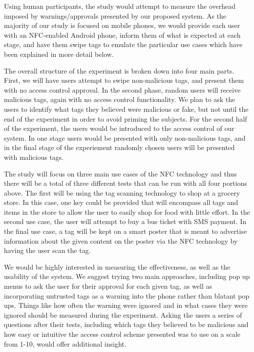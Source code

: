 \documentclass[12pt]{article}
\begin{document}
Using human participants, the study would attempt to measure the overhead imposed by warnings/approvals presented by our proposed system. As the majority of our study is focused on mobile phones, we would provide each user with an NFC-enabled Android phone, inform them of what is expected at each stage, and have them swipe tags to emulate the particular use cases which have been explained in more detail below.

The overall structure of the experiment is broken down into four main parts. First, we will have users attempt to swipe non-malicious tags, and present them with no access control approval. In the second phase, random users will receive malicious tags, again with no access control functionality. We plan to ask the users to identify what tags they believed were malicious or fake, but not until the end of the experiment in order to avoid priming the subjects. For the second half of the experiment, the users would be introduced to the access control of our system. In one stage users would be presented with only non-malicious tags, and in the final stage of the experiement randomly chosen users will be presented with malicious tags. 

The study will focus on three main use cases of the NFC technology and thus there will be a total of three different tests that can be run with all four portions above. The first will be using the tag scanning technology to shop at a grocery store. In this case, one key could be provided that will encompass all tags and items in the store to allow the user to easily shop for food with little effort. In the second use case, the user will attempt to buy a bus ticket with SMS payment. In the final use case, a tag will be kept on a smart poster that is meant to advertise information about the given content on the poster via the NFC technology by having the user scan the tag. 

We would be highly interested in measuring the effectiveness, as well as the usability of the system. We suggest trying two main approaches, including pop up menus to ask the user for their approval for each given tag, as well as incorporating untrusted tags as a warning into the phone rather than blatant pop ups. Things like how often the warning were ignored and in what cases they were ignored should be measured during the experiment. Asking the users a series of questions after their tests, including which tags they believed to be malicious and how easy or intuitive the access control scheme presented was to use on a scale from 1-10, would offer additional insight. 
\end{document}
